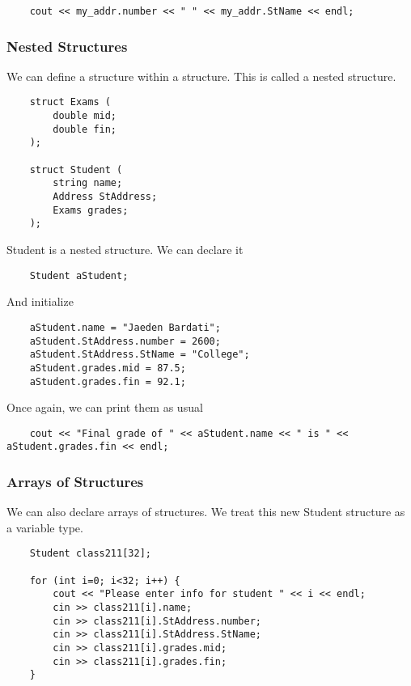 \documentclass[]{article}
\begin{document}
\begin{lstlisting}
	cout << my_addr.number << " " << my_addr.StName << endl;
\end{lstlisting}\bigbreak


\subsubsection{Nested Structures}
\bigbreak

We can define a structure within a structure. This is called a nested structure.\\

\begin{lstlisting}
	struct Exams (
		double mid;
		double fin;
	);
	
	struct Student (
		string name;
		Address StAddress;
		Exams grades;
	);
\end{lstlisting}\bigbreak

Student is a nested structure. We can declare it

\begin{lstlisting}
	Student aStudent;
\end{lstlisting}\bigbreak

And initialize

\begin{lstlisting}
	aStudent.name = "Jaeden Bardati";
	aStudent.StAddress.number = 2600;
	aStudent.StAddress.StName = "College";
	aStudent.grades.mid = 87.5;
	aStudent.grades.fin = 92.1;
\end{lstlisting}\bigbreak

Once again, we can print them as usual

\begin{lstlisting}
	cout << "Final grade of " << aStudent.name << " is " << aStudent.grades.fin << endl;
\end{lstlisting}\bigbreak


\subsubsection{Arrays of Structures}
\bigbreak

We can also declare arrays of structures. We treat this new Student structure as a variable type.

\begin{lstlisting}
	Student class211[32];
	
	for (int i=0; i<32; i++) {
		cout << "Please enter info for student " << i << endl;
		cin >> class211[i].name;
		cin >> class211[i].StAddress.number;
		cin >> class211[i].StAddress.StName;
		cin >> class211[i].grades.mid;
		cin >> class211[i].grades.fin;
	}
\end{lstlisting}\bigbreak
\end{document}
